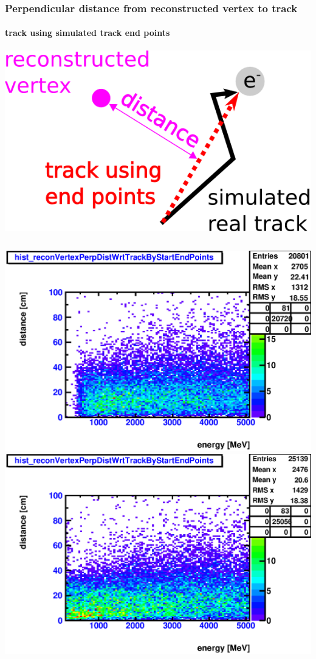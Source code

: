 \documentclass{beamer}
\begin{document}
\begin{frame}
	\frametitle{Perpendicular distance from reconstructed vertex to track}
	\framesubtitle{track using simulated track end points}
	\begin{center}
		\includegraphics[height=0.2\textheight]{vertex_perpendicular_distance_from_track.png}
	\end{center}
	\begin{columns}[t]
		\includegraphics[width=1.0\textwidth]{nue_H1_reconVertexPerpDistWrtTrackByStartEndPoints_onlyCC_maxR600cm.eps}\\
		\includegraphics[width=1.0\textwidth]{nue_C12_reconVertexPerpDistWrtTrackByStartEndPoints_onlyCC_maxR600cm.eps}
	\end{columns}
\end{frame}
\end{document}
